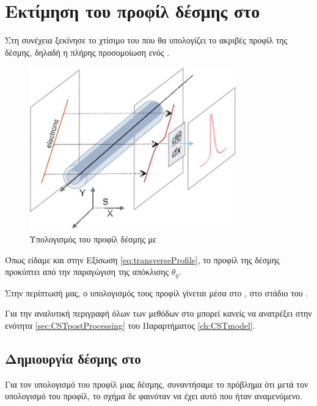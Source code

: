 \section{Εκτίμηση του προφίλ δέσμης στο }

Στη συνέχεια ξεκίνησε το χτίσιμο του  που θα υπολογίζει το ακριβές προφίλ της δέσμης, δηλαδή η πλήρης προσομοίωση ενός .

\begin{figure}[tph]
\includegraphics[width=0.8\textwidth]{figures/EBS-profile-calculation}
\centering
\caption{Υπολογισμός του προφίλ δέσμης με }
\label{fig:EBS-profile-calculation}
\end{figure}

Όπως είδαμε και στην Εξίσωση \ref{eq:transverseProfile}, το προφίλ της δέσμης προκύπτει από την παραγώγιση  της απόκλισης $\theta_y$.

Στην περίπτωσή μας, ο υπολογισμός τους προφίλ γίνεται μέσα στο , στο στάδιο του .

Για την αναλυτική περιγραφή όλων των μεθόδων  στο  μπορεί κανείς να ανατρέξει στην ενότητα \ref{sec:CSTpostProcessing}  του Παραρτήματος \ref{ch:CSTmodel}.

\subsection{Δημιουργία  δέσμης στο }

Για τον υπολογισμό του προφίλ μιας  δέσμης, συναντήσαμε το πρόβλημα ότι μετά τον υπολογισμό του προφίλ, το σχήμα δε φαινόταν να έχει αυτό που ήταν αναμενόμενο.

